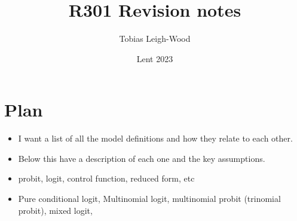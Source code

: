 \documentclass[12pt]{article}
\date{Lent 2023}
\title{R301 Revision notes}
\author{Tobias Leigh-Wood}
\begin{document}
\maketitle

\section*{Plan}
\begin{itemize}
    \item I want a list of all the model definitions and how they relate to each other.
    \item Below this have a description of each one and the key assumptions.

\end{itemize}

\begin{itemize}
    \item probit, logit, control function, reduced form, etc
    \item Pure conditional logit, Multinomial logit, multinomial probit (trinomial probit), mixed logit,
\end{itemize}
\end{document}
